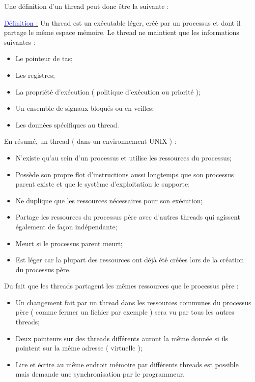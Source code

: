 \documentclass[fleqn,11pt]{article}
\begin{document}
Une définition d'un thread peut donc être la suivante  : 

\underline{\textcolor{blue}{Définition} :} Un thread est un exécutable léger,
créé par un processus et dont il partage le même espace mémoire. Le thread ne maintient
que les informations suivantes :
\begin{itemize}
 \item Le pointeur de tas;
 \item Les registres;
 \item La propriété d'exécution ( politique d'exécution ou priorité );
 \item Un ensemble de signaux bloqués ou en veilles;
 \item Les données spécifiques au thread.
\end{itemize}

En résumé, un thread ( dans un environnement UNIX ) :
\begin{itemize}
 \item N'existe qu'au sein d'un processus et utilise les ressources du processus;
 \item Possède son propre flot d'instructions aussi longtemps que son processus parent
       existe et que le système d'exploitation le supporte;
 \item Ne duplique que les ressources nécessaires pour son exécution;
 \item Partage les ressources du processus père avec d'autres threads qui agissent également de
 façon indépendante;
 \item Meurt si le processus parent meurt;
 \item Est léger car la plupart des ressources ont déjà été créées lors de la création du processus père.
\end{itemize}

Du fait que les threads partagent les mêmes ressources que le processus père :
\begin{itemize}
 \item Un changement fait par un thread dans les ressources communes du processus père ( comme fermer un fichier par exemple ) sera vu par tous les autres threads;
 \item Deux pointeurs sur des threads différents auront la même donnée si ils pointent sur la même adresse ( virtuelle );
 \item Lire et écrire au même endroit mémoire par différents threads est possible mais demande une synchronisation par le programmeur.
\end{itemize}
\end{document}

